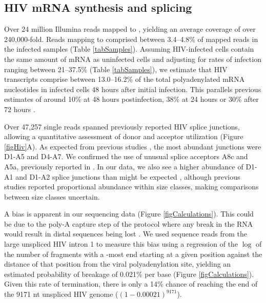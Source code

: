 \documentclass[../sherrill-Mix_thesis.tex]{subfiles}
\begin{document}
	\subsection{HIV mRNA synthesis and splicing} %
		Over 24 million Illumina reads mapped to \hivEight{}, yielding an average coverage of over 240,000-fold.  Reads mapping to \hivEight{} comprised between 3.4--4.8\% of mapped reads in the infected samples (Table \ref{tabSamples}). Assuming HIV-infected cells contain the same amount of mRNA as uninfected cells and adjusting for rates of infection ranging between 21--37.5\% (Table \ref{tabSamples}), we estimate that HIV transcripts comprise between 13.0--16.2\% of the total polyadenylated mRNA nucleotides in infected cells 48 hours after initial infection. This parallels previous estimates of around 10\% \citep{Whisnant2013} at 48 hours postinfection, 38\% at 24 hours \citep{Chang2011} or 30\% after 72 hours \citep{Corbeil2001}. %

		Over 47,257 single reads spanned previously reported HIV splice junctions, allowing a quantitative assessment of donor and acceptor utilization (Figure \ref{figHiv}A). As expected from previous studies \citep{Purcell1993,Ocwieja2012}, the most abundant junctions were D1-A5 and D4-A7.  We confirmed the use of unusual splice acceptors A8c and A5a, previously reported in \hivEight{} \citep{Ocwieja2012}. In our data, we also see a higher abundance of D1-A1 and D1-A2 splice junctions than might be expected \citep{Purcell1993,Ocwieja2012}, although previous studies reported proportional abundance within size classes, making comparisons between size classes uncertain. %

		A \threePrime{} bias is apparent in our sequencing data (Figure \ref{figCalculations}). This could be due to the poly-A capture step of the protocol where any break in the RNA would result in distal \fivePrime{} sequences being lost \citep{Lahens2014}. We used sequence reads from the large unspliced HIV intron 1 to measure this bias using a regression of the $\log$ of the number of fragments with a \fivePrime{}-most end starting at a given position against the distance of that position from the viral polyadenylation site, yielding an estimated probability of breakage of 0.021\% per base (Figure \ref{figCalculations}). Given this rate of termination, there is only a 14\% chance of reaching the \fivePrime{} end of the 9171 nt unspliced HIV genome (\((1-0.00021)^{9171}\)). 
\end{document}
